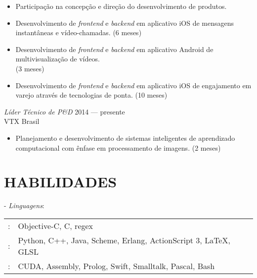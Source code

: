 \documentclass[]{res} %
\newcommand{\sbt}{\,\begin{picture}(-1,1)(-2,-3)\circle*{2}\end{picture}\ }
\def \divspace{6pt}
\def \myitemback{0.55cm}
\def \myitemsep{0pt}
\def \mypositionface{\sl}
\def \myorgface{\sc}
\begin{document}
\begin{resume}
\begin{itemize}[itemsep=\myitemsep,leftmargin=\myitemback]
\item[\sbt] Participação na concepção e direção do desenvolvimento de produtos.
\item[\sbt] Desenvolvimento de {\it frontend} e {\it backend} em aplicativo iOS de mensagens instantâneas e vídeo-chamadas. (6 meses)
\item[\sbt] Desenvolvimento de {\it frontend} e {\it backend} em aplicativo Android de multivisualização de vídeos.\\ (3 meses)
\item[\sbt] Desenvolvimento de {\it frontend} e {\it backend} em aplicativo iOS de engajamento em varejo através de tecnologias de ponta. (10 meses)
\end{itemize}

{\mypositionface Líder Técnico de P\&D} \hfill 2014 — presente \\
{\myorgface VTX Brasil}

\begin{itemize}[itemsep=\myitemsep,leftmargin=\myitemback]
\item[\sbt] Planejamento e desenvolvimento de sistemas inteligentes de aprendizado computacional com ênfase em processamento de imagens. (2 meses)
\end{itemize}

\section{HABILIDADES \hspace{\divspace} }

- {\sl Linguagens}: \\
\setlength\tabcolsep{2pt}
\begin{tabular}{l l}
\hspace*{1em}{\it Fluente}:& Objective-C, C, regex \\
\hspace*{1em}{\it Muito Familiar}:& Python, C++, Java, Scheme, Erlang, ActionScript 3, \LaTeX, GLSL \\
\hspace*{1em}{\it Pouco Familiar}:& CUDA, Assembly, Prolog, Swift, Smalltalk, Pascal, Bash \\
\end{tabular}


\end{resume}
\end{document}

